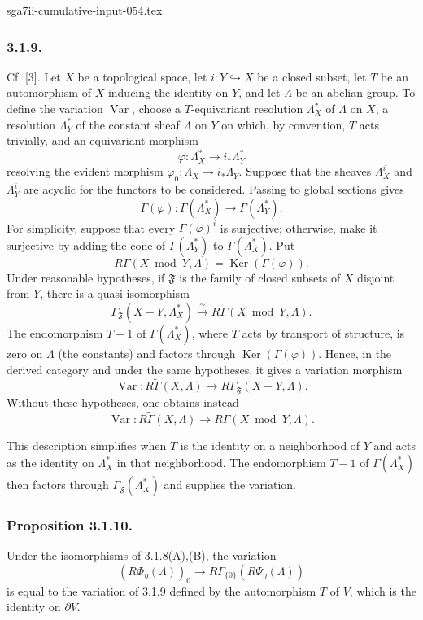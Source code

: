 \begin{filecontents*}{sga7ii-cumulative-input-054.tex}
\subsubsection*{3.1.9.}
Cf. [3].  Let $X$ be a topological space, let
$i:Y\hookrightarrow X$ be a closed subset, let $T$ be an
automorphism of $X$ inducing the identity on $Y$, and let $\Lambda$ be
an abelian group.  To define the variation $\operatorname{Var}$,
choose a $T$-equivariant resolution $\Lambda_X^*$ of $\Lambda$ on
$X$, a resolution $\Lambda_Y^*$ of the constant sheaf $\Lambda$ on
$Y$ on which, by convention, $T$ acts trivially, and an equivariant
morphism
\[
\varphi:\Lambda_X^*\longrightarrow i_*\Lambda_Y^*
\]
resolving the evident morphism
$\varphi_0:\Lambda_X\to i_*\Lambda_Y$.  Suppose that the sheaves
$\Lambda_X^i$ and $\Lambda_Y^i$ are acyclic for the functors to be
considered.  Passing to global sections gives
\[
\Gamma(\varphi):\Gamma(\Lambda_X^*)
\longrightarrow\Gamma(\Lambda_Y^*).
\]
For simplicity, suppose that every $\Gamma(\varphi)^i$ is surjective;
otherwise, make it surjective by adding the cone of
$\Gamma(\Lambda_Y^*)$ to $\Gamma(\Lambda_X^*)$.  Put
\[
R\Gamma(X\bmod Y,\Lambda)=\operatorname{Ker}(\Gamma(\varphi)).
\]
Under reasonable hypotheses, if $\mathfrak F$ is the family of closed
subsets of $X$ disjoint from $Y$, there is a quasi-isomorphism
\[
\Gamma_{\mathfrak F}(X-Y,\Lambda_X^*)
\xrightarrow{\ \sim\ }R\Gamma(X\bmod Y,\Lambda).
\]
The endomorphism $T-1$ of $\Gamma(\Lambda_X^*)$, where $T$ acts by
transport of structure, is zero on $\Lambda$ (the constants) and
factors through $\operatorname{Ker}(\Gamma(\varphi))$.  Hence, in the
derived category and under the same hypotheses, it gives a variation
morphism
\[
\operatorname{Var}:R\widetilde\Gamma(X,\Lambda)
\longrightarrow R\Gamma_{\mathfrak F}(X-Y,\Lambda).
\]
Without these hypotheses, one obtains instead
\[
\operatorname{Var}:R\widetilde\Gamma(X,\Lambda)
\longrightarrow R\Gamma(X\bmod Y,\Lambda).
\]

This description simplifies when $T$ is the identity on a
neighborhood of $Y$ and acts as the identity on $\Lambda_X^*$ in that
neighborhood.  The endomorphism $T-1$ of $\Gamma(\Lambda_X^*)$ then
factors through $\Gamma_{\mathfrak F}(\Lambda_X^*)$ and supplies the
variation.

\subsubsection*{Proposition 3.1.10.}
Under the isomorphisms of 3.1.8(A),(B), the variation
\[
(R\Phi_\eta(\Lambda))_0
\longrightarrow R\Gamma_{\{0\}}(R\Psi_\eta(\Lambda))
\]
is equal to the variation of 3.1.9 defined by the automorphism $T$ of
$V$, which is the identity on $\partial V$.


\end{filecontents*}

